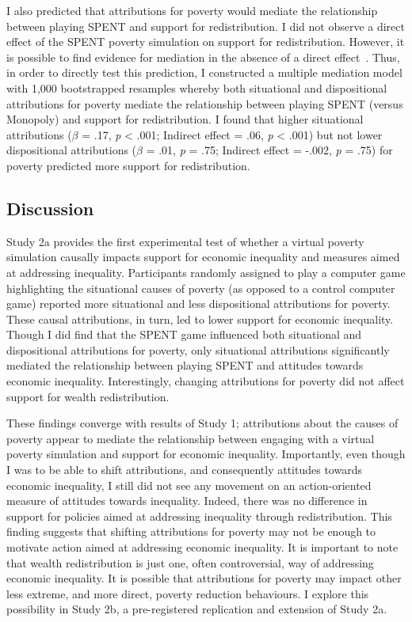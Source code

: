 \documentclass{sfuthesis}
\begin{document}
I also predicted that attributions for poverty would mediate the relationship between playing SPENT and support for redistribution. I did not observe a direct effect of the SPENT poverty simulation on support for redistribution. However, it is possible to find evidence for mediation in the absence of a direct effect~\cite{hayes13}. Thus, in order to directly test this prediction, I constructed a multiple mediation model with 1,000 bootstrapped resamples whereby both situational and dispositional attributions for poverty mediate the relationship between playing SPENT (versus Monopoly) and support for redistribution. I found that higher situational attributions ($\beta$ = .17, \textit{p} < .001; Indirect effect = .06, \textit{p} < .001) but not lower dispositional attributions ($\beta$ = .01, \textit{p} = .75; Indirect effect = -.002, \textit{p} = .75) for poverty predicted more support for redistribution.

\subsection{Discussion}

Study 2a provides the first experimental test of whether a virtual poverty simulation causally impacts support for economic inequality and measures aimed at addressing inequality. Participants randomly assigned to play a computer game highlighting the situational causes of poverty (as opposed to a control computer game) reported more situational and less dispositional attributions for poverty. These causal attributions, in turn, led to lower support for economic inequality. Though I did find that the SPENT game influenced both situational and dispositional attributions for poverty, only situational attributions significantly mediated the relationship between playing SPENT and attitudes towards economic inequality. Interestingly, changing attributions for poverty did not affect support for wealth redistribution. 

These findings converge with results of Study 1; attributions about the causes of poverty appear to mediate the relationship between engaging with a virtual poverty simulation and support for economic inequality. Importantly, even though I was to be able to shift attributions, and consequently attitudes towards economic inequality, I still did not see any movement on an action-oriented measure of attitudes towards inequality. Indeed, there was no difference in support for policies aimed at addressing inequality through redistribution. This finding suggests that shifting attributions for poverty may not be enough to motivate action aimed at addressing economic inequality. It is important to note that wealth redistribution is just one, often controversial, way of addressing economic inequality. It is possible that attributions for poverty may impact other less extreme, and more direct, poverty reduction behaviours. I explore this possibility in Study 2b, a pre-registered replication and extension of Study 2a.
\end{document}
